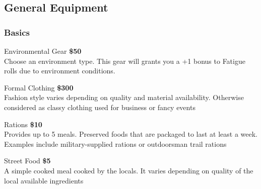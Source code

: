 \subsection{General Equipment}

\begin{multicols}{2}

\subsubsection{Basics}

\begin{genericsection}{Environmental Gear}
\textbf{\$50}\\
Choose an environment type. This gear will grants you a +1 bonus to Fatigue rolls due to environment conditions.
\end{genericsection}

\begin{genericsection}{Formal Clothing}
\textbf{\$300}\\
Fashion style varies depending on quality and material availability. Otherwise considered as classy clothing used for business or fancy events
\end{genericsection}

\begin{genericsection}{Rations}
\textbf{\$10}\\
Provides up to 5 meals. Preserved foods that are packaged to last at least a week. Examples include military-supplied rations or outdoorsman trail rations
\end{genericsection}

\begin{genericsection}{Street Food}
\textbf{\$5}\\
A simple cooked meal cooked by the locals. It varies depending on quality of the local available ingredients
\end{genericsection}





\end{multicols}
